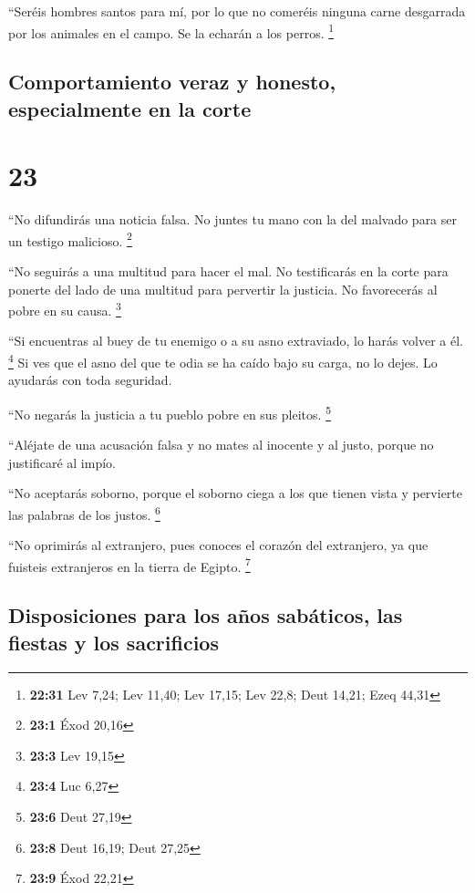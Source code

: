  ``Seréis hombres santos para mí, por lo que no comeréis
ninguna carne desgarrada por los animales en el campo. Se la echarán a
los perros. \footnote{\textbf{22:31} Lev 7,24; Lev 11,40; Lev 17,15; Lev
  22,8; Deut 14,21; Ezeq 44,31}

\hypertarget{comportamiento-veraz-y-honesto-especialmente-en-la-corte}{%
\subsection{Comportamiento veraz y honesto, especialmente en la
corte}\label{comportamiento-veraz-y-honesto-especialmente-en-la-corte}}

\hypertarget{section-22}{%
\section{23}\label{section-22}}

 ``No difundirás una noticia falsa. No juntes tu mano con
la del malvado para ser un testigo malicioso. \footnote{\textbf{23:1}
  Éxod 20,16}

 ``No seguirás a una multitud para hacer el mal. No
testificarás en la corte para ponerte del lado de una multitud para
pervertir la justicia.  No favorecerás al pobre en su
causa. \footnote{\textbf{23:3} Lev 19,15}

 ``Si encuentras al buey de tu enemigo o a su asno
extraviado, lo harás volver a él. \footnote{\textbf{23:4} Luc 6,27}
 Si ves que el asno del que te odia se ha caído bajo su
carga, no lo dejes. Lo ayudarás con toda seguridad.

 ``No negarás la justicia a tu pueblo pobre en sus
pleitos. \footnote{\textbf{23:6} Deut 27,19}

 ``Aléjate de una acusación falsa y no mates al inocente y
al justo, porque no justificaré al impío.

 ``No aceptarás soborno, porque el soborno ciega a los que
tienen vista y pervierte las palabras de los justos. \footnote{\textbf{23:8}
  Deut 16,19; Deut 27,25}

 ``No oprimirás al extranjero, pues conoces el corazón del
extranjero, ya que fuisteis extranjeros en la tierra de Egipto.
\footnote{\textbf{23:9} Éxod 22,21}

\hypertarget{disposiciones-para-los-auxf1os-sabuxe1ticos-las-fiestas-y-los-sacrificios}{%
\subsection{Disposiciones para los años sabáticos, las fiestas y los
sacrificios}\label{disposiciones-para-los-auxf1os-sabuxe1ticos-las-fiestas-y-los-sacrificios}}

